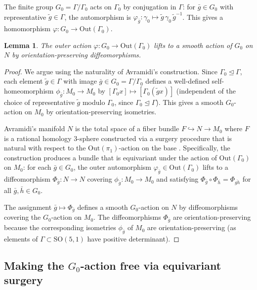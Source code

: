 \documentclass[12pt]{article}
\newtheorem{lemma}[theorem]{Lemma}
\theoremstyle{definition}
\theoremstyle{remark}
\begin{document}
The finite group $G_0 = \Gamma/\Gamma_0$ acts on $\Gamma_0$ by conjugation in $\Gamma$:
for $\bar{g} \in G_0$ with representative $\tilde{g} \in \Gamma$, the automorphism is
$\varphi_{\bar{g}}: \gamma_0 \mapsto \tilde{g}\,\gamma_0\,\tilde{g}^{-1}$.
This gives a homomorphism $\varphi: G_0 \to \mathrm{Out}(\Gamma_0)$.

\begin{lemma}
\label{lem:action-lift}
The outer action $\varphi: G_0 \to \mathrm{Out}(\Gamma_0)$ lifts to a smooth action
of $G_0$ on $N$ by orientation-preserving diffeomorphisms.
\end{lemma}

\begin{proof}
We argue using the naturality of Avramidi's construction. Since $\Gamma_0 \unlhd \Gamma$,
each element $\tilde{g} \in \Gamma$ with image $\bar{g} \in G_0 = \Gamma/\Gamma_0$
defines a well-defined self-homeomorphism $\phi_{\bar{g}}: M_0 \to M_0$ by
$[\Gamma_0 x] \mapsto [\Gamma_0 (\tilde{g} x)]$ (independent of the choice of
representative $\tilde{g}$ modulo $\Gamma_0$, since $\Gamma_0 \unlhd \Gamma$).
This gives a smooth $G_0$-action on $M_0$ by orientation-preserving isometries.

Avramidi's manifold $N$ is the total space of a fiber bundle $F \hookrightarrow N \to M_0$
where $F$ is a rational homology 3-sphere constructed via a surgery procedure
that is natural with respect to the $\mathrm{Out}(\pi_1)$-action on the base
\cite[Sect.~3]{Avramidi2018}. Specifically, the construction produces a bundle
that is equivariant under the action of $\mathrm{Out}(\Gamma_0)$ on $M_0$:
for each $\bar{g} \in G_0$, the outer automorphism $\varphi_{\bar{g}} \in \mathrm{Out}(\Gamma_0)$
lifts to a diffeomorphism $\Phi_{\bar{g}}: N \to N$ covering $\phi_{\bar{g}}: M_0 \to M_0$
and satisfying $\Phi_{\bar{g}} \circ \Phi_{\bar{h}} = \Phi_{\overline{gh}}$ for all
$\bar{g}, \bar{h} \in G_0$.

The assignment $\bar{g} \mapsto \Phi_{\bar{g}}$ defines a smooth $G_0$-action on $N$
by diffeomorphisms covering the $G_0$-action on $M_0$. The diffeomorphisms
$\Phi_{\bar{g}}$ are orientation-preserving because the corresponding isometries
$\phi_{\bar{g}}$ of $M_0$ are orientation-preserving (as elements of $\Gamma \subset
\mathrm{SO}(5,1)$ have positive determinant).
\end{proof}

\subsection{Making the $G_0$-action free via equivariant surgery}
\label{sub:free}
\end{document}
